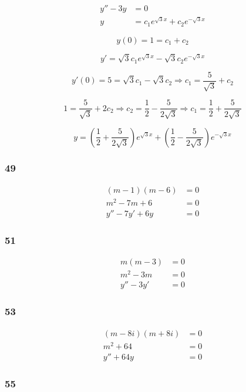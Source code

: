 \documentclass{article}
\begin{document}
\begin{align*}
  y'' - 3y & = 0                                        \\
  y        & = c_1 e^{\sqrt{3} x} + c_2 e^{-\sqrt{3} x}
\end{align*}

\[y(0) = 1 = c_1 + c_2\]

\[y' = \sqrt{3} c_1 e^{\sqrt{3} x} - \sqrt{3} c_2 e^{-\sqrt{3} x}\]

\[y'(0) = 5 = \sqrt{3} c_1 - \sqrt{3} c_2 \Rightarrow c_1 = \frac{5}{\sqrt{3}} + c_2\]

\[1 = \frac{5}{\sqrt{3}} + 2 c_2 \Rightarrow c_2 = \frac{1}{2} - \frac{5}{2 \sqrt{3}} \Rightarrow c_1 = \frac{1}{2} + \frac{5}{2 \sqrt{3}}\]

\[y = \left( \frac{1}{2} + \frac{5}{2 \sqrt{3}} \right) e^{\sqrt{3} x} + \left( \frac{1}{2} - \frac{5}{2 \sqrt{3}} \right) e^{-\sqrt{3} x}\]

\subsubsection{49}

\begin{align*}
  (m - 1) (m - 6) & = 0 \\
  m^2 - 7m + 6    & = 0 \\
  y'' - 7y' + 6y  & = 0
\end{align*}

\subsubsection{51}

\begin{align*}
  m (m - 3) & = 0 \\
  m^2 - 3m  & = 0 \\
  y'' - 3y' & = 0
\end{align*}

\subsubsection{53}

\begin{align*}
  (m - 8i) (m + 8i) & = 0 \\
  m^2 + 64          & = 0 \\
  y'' + 64y         & = 0
\end{align*}

\subsubsection{55}
\end{document}
